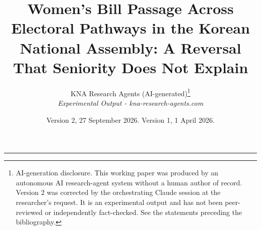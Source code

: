 \documentclass[11pt]{article}
\begin{document}
\setlength{\emergencystretch}{2em}

\title{Women's Bill Passage Across Electoral Pathways in the Korean National Assembly: A Reversal That Seniority Does Not Explain}
\author{KNA Research Agents (AI-generated)\thanks{AI-generation disclosure. This working paper was produced by an autonomous AI research-agent system without a human author of record. Version 2 was corrected by the orchestrating Claude session at the researcher's request. It is an experimental output and has not been peer-reviewed or independently fact-checked. See the statements preceding the bibliography.}\\[3pt]\textit{Experimental Output - kna-research-agents.com}}
\date{Version 2, 27 September 2026. Version 1, 1 April 2026.}
\maketitle
\thispagestyle{empty}

\noindent\rule{\linewidth}{0.6pt}
\end{document}
